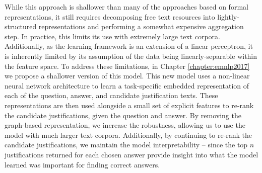 While this approach is shallower than many of the approaches based on formal representations, it still requires decomposing free text resources into lightly-structured representations and performing a somewhat expensive aggregation step.  In practice, this limits its use with extremely large text corpora.  Additionally, as the learning framework is an extension of a linear perceptron, it is inherently limited by its assumption of the data being linearly-separable within the feature space.  To address these limitations, in Chapter \ref{chapter:emnlp2017} we propose a shallower version of this model.  This new model uses a non-linear neural network architecture to learn a task-specific embedded representation of each of the question, answer, and candidate justification texts.  These representations are then used alongside a small set of explicit features to re-rank the candidate justifications, given the question and answer.  By removing the graph-based representation, we increase the robustness, allowing us to use the model with much larger text corpora.   Additionally, by continuing to re-rank the candidate justifications, we maintain the model interpretability -- since the top $n$ justifications returned for each chosen answer provide insight into what the model learned was important for finding correct answers.

